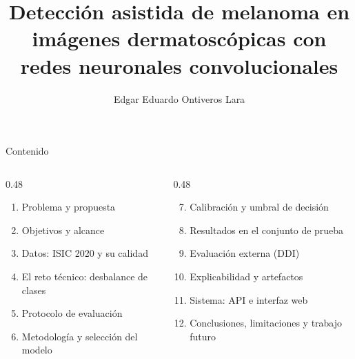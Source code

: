 \documentclass[aspectratio=169,10pt]{beamer}
\title[Detección asistida de melanoma]{Detección asistida de melanoma en imágenes dermatoscópicas con redes neuronales convolucionales}
\subtitle{\subtitulo}
\institute[UACH-FING]{Universidad Autónoma de Chihuahua\\Facultad de Ingeniería\\[0.4em]\texttt{\correo}}
\date{\fecha}
\author[E. E. Ontiveros Lara]{Edgar Eduardo Ontiveros Lara}
\begin{document}
\begin{frame}[plain]
  \titlepage
\end{frame}

\begin{frame}{Contenido}
  \begin{columns}[T]
    \begin{column}{0.48\textwidth}
      \begin{enumerate}
        \item Problema y propuesta
        \item Objetivos y alcance
        \item Datos: ISIC 2020 y su calidad
        \item El reto técnico: desbalance de clases
        \item Protocolo de evaluación
        \item Metodología y selección del modelo
      \end{enumerate}
    \end{column}
    \begin{column}{0.48\textwidth}
      \begin{enumerate}
        \setcounter{enumi}{6}
        \item Calibración y umbral de decisión
        \item Resultados en el conjunto de prueba
        \item Evaluación externa (DDI)
        \item Explicabilidad y artefactos
        \item Sistema: API e interfaz web
        \item Conclusiones, limitaciones y trabajo futuro
      \end{enumerate}
    \end{column}
  \end{columns}
\end{frame}
\end{document}
